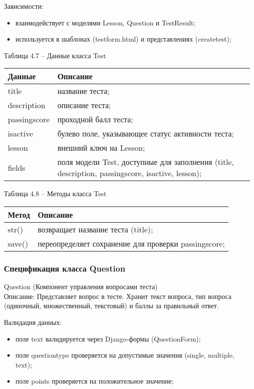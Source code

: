 Зависимости: 
\begin{itemize}
	\item взаимодействует с моделями Lesson, Question и TestResult; 
	\item используется в шаблонах (testform.html) и представлениях (createtest); 
\end{itemize}

Таблица 4.7 – Данные класса Test \\
\begin{tabular}{|p{4cm}|p{8cm}|}
	\hline
	Данные & Описание \\
	\hline
	title & название теста; \\
	description & описание теста; \\
	passingscore & проходной балл теста; \\
	isactive & булево поле, указывающее статус активности теста; \\
	lesson & внешний ключ на Lesson; \\
	fields & поля модели Test, доступные для заполнения (title, description, passingscore, isactive, lesson); \\
	\hline
\end{tabular}

Таблица 4.8 – Методы класса Test \\
\begin{tabular}{|p{4cm}|p{8cm}|}
	\hline
	Метод & Описание \\
	\hline
	str() & возвращает название теста (title); \\
	save() & переопределяет сохранение для проверки passingscore; \\
	\hline
\end{tabular}

\subsubsection{Спецификация класса Question}
Question (Компонент управления вопросами теста) \\
Описание: Представляет вопрос в тесте. Хранит текст вопроса, тип вопроса (одиночный, множественный, текстовый) и баллы за правильный ответ.

Валидация данных: 
\begin{itemize}
	\item поле text валидируется через Django-формы (QuestionForm); 
	\item поле questiontype проверяется на допустимые значения (single, multiple, text); 
	\item поле points проверяется на положительное значение; 
\end{itemize}

